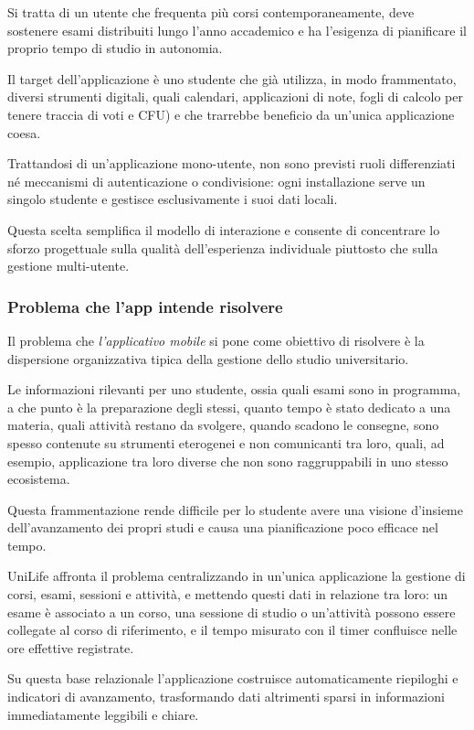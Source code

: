 \documentclass[a4paper, 12pt]{article}
\begin{document}
Si tratta di un utente che frequenta più corsi contemporaneamente, deve sostenere esami distribuiti lungo l'anno accademico e ha l'esigenza di pianificare il proprio tempo di studio in autonomia. 

Il target dell'applicazione è uno studente che già utilizza, in modo frammentato, diversi strumenti digitali, quali calendari, applicazioni di note, fogli di calcolo per tenere traccia di voti e CFU) e che trarrebbe beneficio da un'unica applicazione coesa.


Trattandosi di un'applicazione mono-utente, non sono previsti ruoli differenziati né meccanismi di autenticazione o condivisione: ogni installazione serve un singolo studente e gestisce esclusivamente i suoi dati locali.

Questa scelta semplifica il modello di interazione e consente di concentrare lo sforzo progettuale sulla qualità dell'esperienza individuale piuttosto che sulla gestione multi-utente.


\subsubsection{Problema che l'app intende risolvere}
Il problema che \emph{l'applicativo mobile} si pone come obiettivo di risolvere è la dispersione organizzativa tipica della gestione dello studio universitario.

Le informazioni rilevanti per uno studente, ossia quali esami sono in programma, a che punto è la preparazione degli stessi, quanto tempo è stato dedicato a una materia, quali attività restano da svolgere, quando scadono le consegne, sono spesso contenute su strumenti eterogenei e non comunicanti tra loro, quali, ad esempio, applicazione tra loro diverse che non sono raggruppabili in uno stesso ecosistema. 

Questa frammentazione rende difficile per lo studente avere una visione d'insieme dell'avanzamento dei propri studi e causa una pianificazione poco efficace nel tempo.

UniLife affronta il problema centralizzando in un'unica applicazione la gestione di corsi, esami, sessioni e attività, e mettendo questi dati in relazione tra loro: un esame è associato a un corso, una sessione di studio o un'attività possono essere collegate al corso di riferimento, e il tempo misurato con il timer confluisce nelle ore effettive registrate. 

Su questa base relazionale l'applicazione costruisce automaticamente riepiloghi e indicatori di avanzamento, trasformando dati altrimenti sparsi in informazioni immediatamente leggibili e chiare. 
\end{document}
